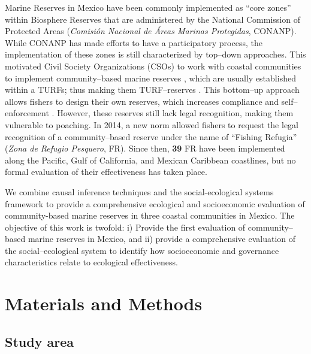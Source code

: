 \documentclass{frontiersSCNS}
\theoremstyle{definition}
\theoremstyle{definition}
\theoremstyle{definition}
\theoremstyle{remark}
\begin{document}
Marine Reserves in Mexico have been commonly implemented as ``core
zones'' within Biosphere Reserves that are administered by the National
Commission of Protected Areas (\emph{Comisión Nacional de Áreas Marinas
Protegidas}, CONANP). While CONANP has made efforts to have a
participatory process, the implementation of these zones is still
characterized by top--down approaches. This motivated Civil Society
Organizations (CSOs) to work with coastal communities to implement
community--based marine reserves \citep{uribe_2010-u2}, which are
usually established within a TURFs; thus making them TURF--reserves
\citep{afflerbach_2014-HP}. This bottom--up approach allows fishers to
design their own reserves, which increases compliance and
self--enforcement
\citep{gelcich_2015-Gw,espinosaromero_2014-PY,beger_2004-Y8}. However,
these reserves still lack legal recognition, making them vulnerable to
poaching. In 2014, a new norm \citep{nom} allowed fishers to request the
legal recognition of a community--based reserve under the name of
``Fishing Refugia'' (\emph{Zona de Refugio Pesquero}, FR). Since then,
\textbf{39} FR have been implemented along the Pacific, Gulf of
California, and Mexican Caribbean coastlines, but no formal evaluation
of their effectiveness has taken place.

We combine causal inference techniques \citep{depalma_2018} and the
social-ecological systems framework \citep{ostrom_2009-hg} to provide a
comprehensive ecological and socioeconomic evaluation of community-based
marine reserves in three coastal communities in Mexico. The objective of
this work is twofold: i) Provide the first evaluation of
community--based marine reserves in Mexico, and ii) provide a
comprehensive evaluation of the social--ecological system to identify
how socioeconomic and governance characteristics relate to ecological
effectiveness.

\section{Materials and Methods}\label{materials-and-methods}

\subsection{Study area}\label{study-area}
\end{document}
